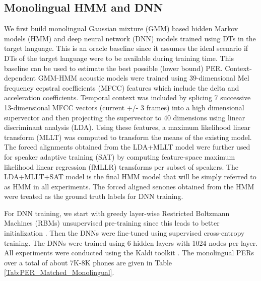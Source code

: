 \documentclass[a4paper]{article}
\begin{document}
\subsection{Monolingual HMM and DNN}
\label{sec:Monolingual HMM and DNN}
We first build monolingual Gaussian mixture (GMM) based hidden Markov models (HMM) and deep neural network (DNN) models trained using DTs in the target language. This is an oracle baseline since it assumes the ideal scenario if DTs of the target language were to be available during training time. This baseline can be used to estimate the best possible (lower bound) PER.
Context-dependent GMM-HMM acoustic models were trained using 39-dimensional Mel frequency cepstral coefficients (MFCC) features which include the delta and acceleration coefficients. Temporal context was included by splicing 7 successive 13-dimensional MFCC vectors (current +/- 3 frames) into a high dimensional supervector and then projecting the supervector to 40 dimensions using linear discriminant analysis (LDA). Using these features, a maximum likelihood linear transform (MLLT) \cite{Gopinath-MLLT} was computed to transform the means of the existing model. The forced alignments obtained from the LDA+MLLT model were further used for speaker adaptive training (SAT) by computing feature-space maximum likelihood linear regression (fMLLR) transforms \cite{Gales-CMLLR} per subset of speakers. The LDA+MLLT+SAT model is the final HMM model that will be simply referred to as HMM in all experiments. The forced aligned senones obtained from the HMM were treated as the ground truth labels for DNN training. 

For DNN training, we start with greedy layer-wise Restricted Boltzmann Machines (RBMs) unsupervised pre-training since this leads to better initialization \cite{Bengio-Pretraining}. Then the DNNs were fine-tuned using supervised cross-entropy training. The DNNs were trained using 6 hidden layers with 1024 nodes per layer. All experiments were conducted using the Kaldi toolkit \cite{Povey-Kaldi}. The monolingual PERs over a total of about 7K-8K phones are given in Table \ref{Tab:PER_Matched_Monolingual}. 
\end{document}
